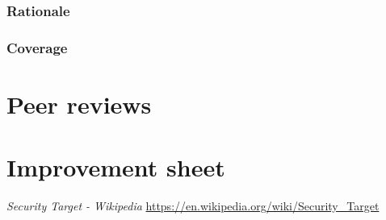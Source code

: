 \documentclass[10pt]{article}
\begin{document}
      \subsubsection{Rationale}

      \subsubsection{Coverage}
        

  \section{Peer reviews}

  \section{Improvement sheet}

  \begin{thebibliography}{9}
	 \textit{Security Target - Wikipedia} \url{https://en.wikipedia.org/wiki/Security_Target}
  \end{thebibliography}
\end{document}
